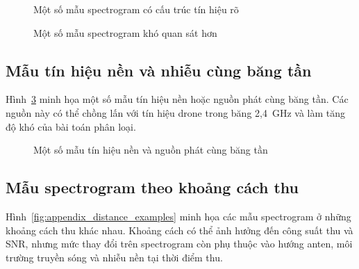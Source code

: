\documentclass[../DoAn.tex]{subfiles}
\begin{document}
\begin{figure}[H]
    \centering
    \hfill
    \hfill
    \caption{Một số mẫu spectrogram có cấu trúc tín hiệu rõ}
    \label{fig:appendix_good_examples}
\end{figure}

\begin{figure}[H]
    \centering
    \hfill
    \hfill
    \caption{Một số mẫu spectrogram khó quan sát hơn}
    \label{fig:appendix_not_good_examples}
\end{figure}

\subsection*{Mẫu tín hiệu nền và nhiễu cùng băng tần}

Hình~\ref{fig:appendix_noise_examples} minh họa một số mẫu tín hiệu nền hoặc nguồn phát cùng băng tần. Các nguồn này
có thể chồng lấn với tín hiệu drone trong băng 2,4~GHz và làm tăng độ khó của bài toán phân loại.

\begin{figure}[H]
    \centering
    \hfill
    \hfill
    \caption{Một số mẫu tín hiệu nền và nguồn phát cùng băng tần}
    \label{fig:appendix_noise_examples}
\end{figure}

\subsection*{Mẫu spectrogram theo khoảng cách thu}

Hình~\ref{fig:appendix_distance_examples} minh họa các mẫu spectrogram ở những khoảng cách thu khác nhau. Khoảng cách
có thể ảnh hưởng đến công suất thu và SNR, nhưng mức thay đổi trên spectrogram còn phụ thuộc vào hướng anten, môi
trường truyền sóng và nhiễu nền tại thời điểm thu.
\end{document}
